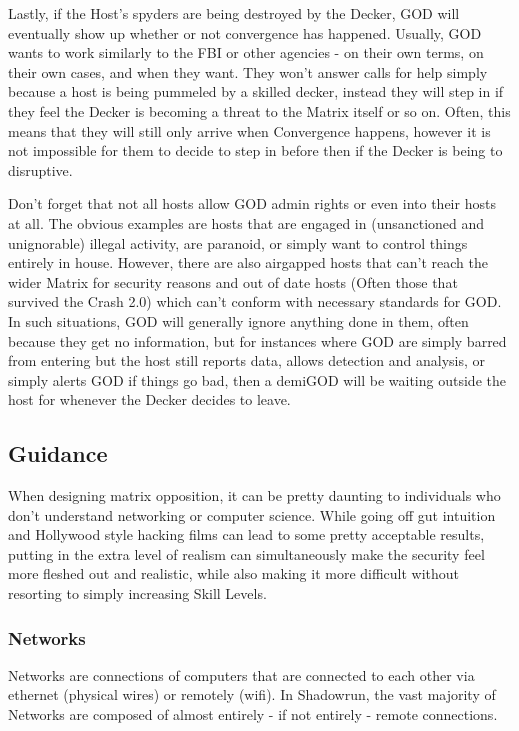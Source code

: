 \begin{multicols*}{3}
	Lastly, if the Host's spyders are being destroyed by the Decker, GOD will eventually show up whether or not convergence has happened. Usually, GOD wants to work similarly to the FBI or other agencies - on their own terms, on their own cases, and when they want. They won't answer calls for help simply because a host is being pummeled by a skilled decker, instead they will step in if they feel the Decker is becoming a threat to the Matrix itself or so on. Often, this means that they will still only arrive when Convergence happens, however it is not impossible for them to decide to step in before then if the Decker is being to disruptive.
	
	Don't forget that not all hosts allow GOD admin rights or even into their hosts at all. The obvious examples are hosts that are engaged in (unsanctioned and unignorable) illegal activity, are paranoid, or simply want to control things entirely in house. However, there are also airgapped hosts that can't reach the wider Matrix for security reasons and out of date hosts (Often those that survived the Crash 2.0) which can't conform with necessary standards for GOD. In such situations, GOD will generally ignore anything done in them, often because they get no information, but for instances where GOD are simply barred from entering but the host still reports data, allows detection and analysis, or simply alerts GOD if things go bad, then a demiGOD will be waiting outside the host for whenever the Decker decides to leave.
	
	\subsection{Guidance}
	
	When designing matrix opposition, it can be pretty daunting to individuals who don't understand networking or computer science. While going off gut intuition and Hollywood style hacking films can lead to some pretty acceptable results, putting in the extra level of realism can simultaneously make the security feel more fleshed out and realistic, while also making it more difficult without resorting to simply increasing Skill Levels.
	
	\subsubsection{Networks}
	
	Networks are connections of computers that are connected to each other via ethernet (physical wires) or remotely (wifi). In Shadowrun, the vast majority of Networks are composed of almost entirely - if not entirely - remote connections. 
	

\end{multicols*}
